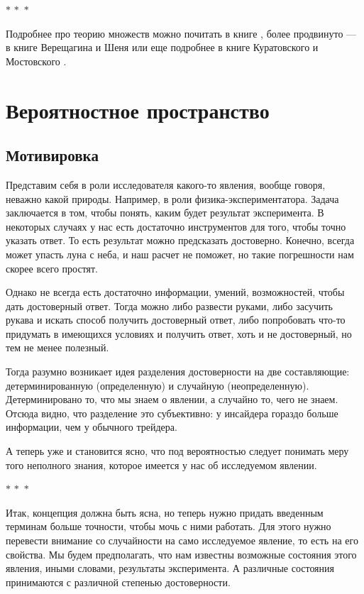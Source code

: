 \documentclass[a4paper,12pt]{article}
\newcommand{\threestars}{\begin{center}$ {\ast}\,{\ast}\,{\ast} $\end{center}}
\newcounter{th-counter}
\begin{document}
\threestars

Подробнее про теорию множеств можно почитать в книге \cite{Viro}, более продвинуто --- в книге Верещагина и Шеня \cite{VereschaginShenSetTheory} или еще подробнее в книге Куратовского и Мостовского \cite{KuratovskijMostovskij1970}.

\section*{Вероятностное пространство}
\subsection*{Мотивировка}
Представим себя в роли исследователя какого-то явления, вообще говоря, неважно какой природы. Например, в роли физика-экспериментатора. Задача заключается в том, чтобы понять, каким будет результат эксперимента. В некоторых случаях у нас есть достаточно инструментов для того, чтобы точно указать ответ. То есть результат можно предсказать достоверно. Конечно, всегда может упасть луна с неба, и наш расчет не поможет, но такие погрешности нам скорее всего простят.

Однако не всегда есть достаточно информации, умений, возможностей, чтобы дать достоверный ответ. Тогда можно либо развести руками, либо засучить рукава и искать способ получить достоверный ответ, либо попробовать что-то придумать в имеющихся условиях и получить ответ, хоть и не достоверный, но тем не менее полезный.

Тогда разумно возникает идея разделения достоверности на две составляющие: детерминированную (определенную) и случайную (неопределенную). Детерминировано то, что мы знаем о явлении, а случайно то, чего не знаем. Отсюда видно, что разделение это субъективно: у инсайдера гораздо больше информации, чем у обычного трейдера.

А теперь уже и становится ясно, что под вероятностью следует понимать меру того неполного знания, которое имеется у нас об исследуемом явлении.

\threestars

Итак, концепция должна быть ясна, но теперь нужно придать введенным терминам больше точности, чтобы мочь с ними работать. Для этого нужно перевести внимание со случайности на само исследуемое явление, то есть на его свойства. Мы будем предполагать, что нам известны возможные состояния этого явления, иными словами, результаты эксперимента. А различные состояния принимаются с различной степенью достоверности.
\end{document}
